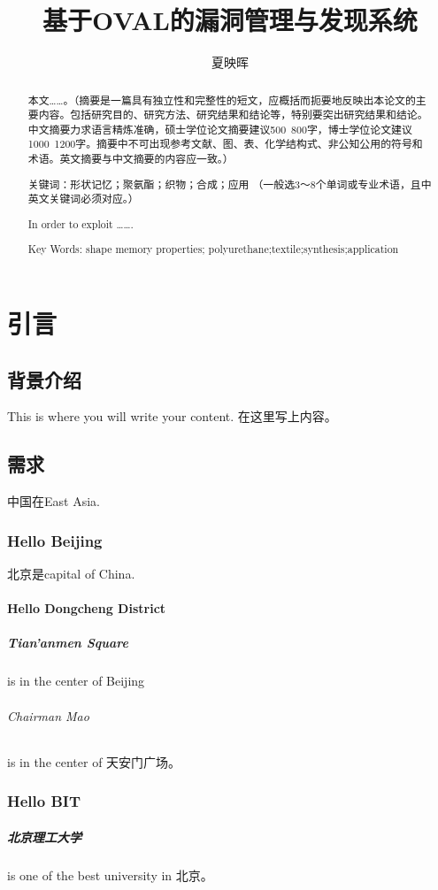 \documentclass[a4paper]{ctexrep}
\title{基于OVAL的漏洞管理与发现系统}
\author{夏映晖}
\date{}
\begin{document}
	\maketitle
	
	\begin{abstract}
		本文……。（摘要是一篇具有独立性和完整性的短文，应概括而扼要地反映出本论文的主要内容。包括研究目的、研究方法、研究结果和结论等，特别要突出研究结果和结论。中文摘要力求语言精炼准确，硕士学位论文摘要建议500~800字，博士学位论文建议1000~1200字。摘要中不可出现参考文献、图、表、化学结构式、非公知公用的符号和术语。英文摘要与中文摘要的内容应一致。）
	
		关键词：形状记忆；聚氨酯；织物；合成；应用 （一般选3～8个单词或专业术语，且中英文关键词必须对应。）
	\end{abstract}
	
	\renewcommand\abstractname{abstract}
	\begin{abstract}
		In order to exploit …….
	
		Key Words: shape memory properties; polyurethane;textile;synthesis;application
	\end{abstract}
	
	\tableofcontents
	\newpage
	\setcounter{page}{1}
	
	\chapter{引言}
		\section{背景介绍}
			This is where you will write your content. 在这里写上内容。
			
		\section{需求} 
			中国在East Asia. 
			\subsection{Hello Beijing}
				北京是capital of China. 
				\subsubsection{Hello Dongcheng District}
					\paragraph{Tian'anmen Square}
					is in the center of Beijing 
						\subparagraph{Chairman Mao}
						is in the center of 天安门广场。
			\subsection{Hello BIT} 
				\paragraph{北京理工大学} is one of the best university in 北京。
	
	\begin{thebibliography}{}
	\end{thebibliography}
\end{document}
